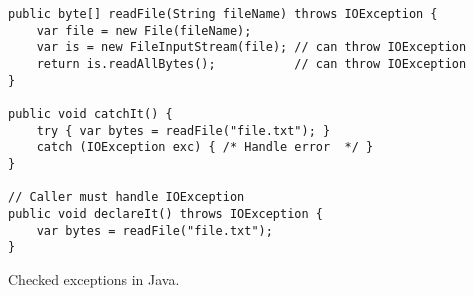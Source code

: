 \begin{algorithm}

\begin{verbatim}
public byte[] readFile(String fileName) throws IOException {
    var file = new File(fileName);
    var is = new FileInputStream(file); // can throw IOException
    return is.readAllBytes();           // can throw IOException
}

public void catchIt() {
    try { var bytes = readFile("file.txt"); }
    catch (IOException exc) { /* Handle error  */ }
}

// Caller must handle IOException
public void declareIt() throws IOException {
    var bytes = readFile("file.txt");
}
\end{verbatim}

\caption{Checked exceptions in Java. \label{java-checked-exc}}
\end{algorithm}